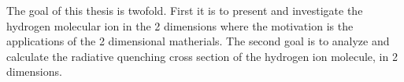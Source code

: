 
The goal of this thesis is twofold. First it is to present and investigate the hydrogen molecular ion in the 2 dimensions where the motivation is the applications of the 2 dimensional matherials.
The second goal is to analyze and calculate the radiative quenching cross section of the hydrogen ion molecule, in 2 dimensions.
